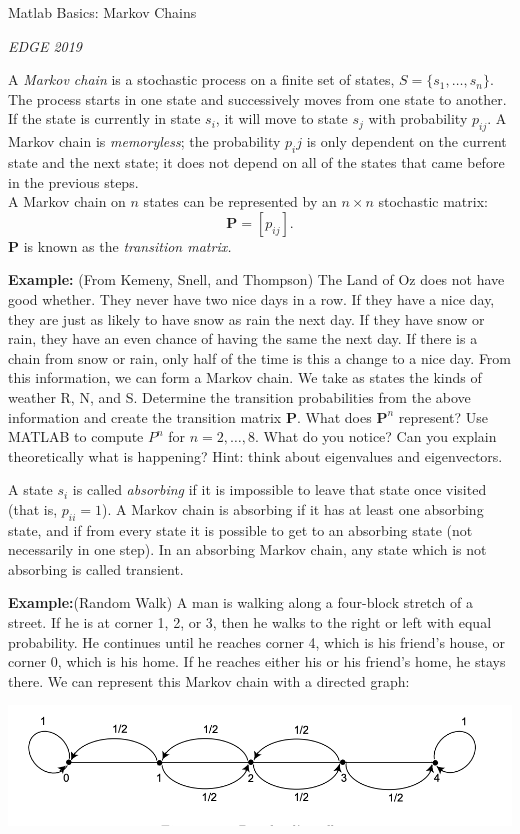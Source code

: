 \documentclass[12pt]{report}
\begin{document}
\centerline{Matlab Basics: Markov Chains }
\centerline{\it EDGE 2019}
\bigskip

A {\it Markov chain} is a stochastic process on a finite set of states, $S=\{s_1,\ldots,s_n\}$. The process starts in one state and successively moves from one state to another.  If the state is currently in state $s_i$, it will move to state $s_j$ with probability $p_{ij}$.  A Markov chain is {\it memoryless}; the probability $p_ij$ is only dependent on the current state and the next state; it does not depend on all of the states that came before in the previous steps. \\
A Markov chain on $n$ states can be represented by an $n\times n$ stochastic matrix: 
$$\mathbf{P}=[p_{ij}].$$
$\mathbf{P}$ is known as the {\it transition matrix.} \\
\vspace{2mm}

\textbf{Example:} (From Kemeny, Snell, and Thompson) The Land of Oz does not have good whether.  They never have two nice days in a row.  If they have a nice day, they are just as likely to have snow as rain the next day.  If they have snow or rain, they have an even chance of having the same the next day.  If there is a chain from snow or rain, only half of the time is this a change to a nice day.  From this information, we can form a Markov chain.  We take as states the kinds of weather R, N, and S.  Determine the transition probabilities from the above information and create the transition matrix $\mathbf{P}$.  What does $\mathbf{P}^n$ represent? Use MATLAB to compute $P^n$ for $n=2,\ldots, 8$.  What do you notice?  Can you explain theoretically what is happening? Hint: think about eigenvalues and eigenvectors. \\
\vspace{2mm}

A state $s_i$ is called {\it absorbing} if it is impossible to leave that state once visited (that is, $p_{ii}=1$).  A Markov chain is absorbing if it has at least one absorbing state, and if from every state it is possible to get to an absorbing state (not necessarily in one step).  In an absorbing Markov chain, any state which is not absorbing is called transient.  \\
\vspace{2mm}

\textbf{Example:}(Random Walk) A man is walking along a four-block stretch of a street.  If he is at corner 1, 2, or 3, then he walks to the right or left with equal probability.  He continues until he reaches corner 4, which is his friend's house, or corner 0, which is his home.  If he reaches either his or his friend's home, he stays there.  We can represent this Markov chain with a directed graph:
\begin{center}
\includegraphics[scale=0.6]{drunkard}
\end{center}
\end{document}
